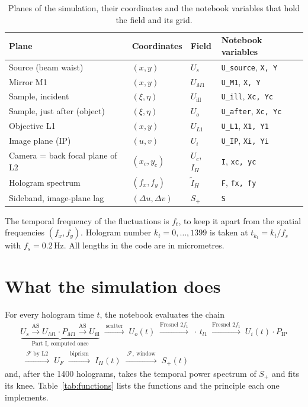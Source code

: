 \documentclass[11pt,a4paper]{article}
\newcommand{\FT}{\mathcal{F}}
\newcommand{\code}[1]{\texttt{\small #1}}
\begin{document}
\begin{table}[ht]
\centering
\small
\caption{Planes of the simulation, their coordinates and the notebook
variables that hold the field and its grid.}
\label{tab:planes}
\begin{tabular}{@{}llll@{}}
\toprule
Plane & Coordinates & Field & Notebook variables \\
\midrule
Source (beam waist) & $(x,y)$ & $U_s$ & \code{U\_source}, \code{X, Y} \\
Mirror M1 & $(x,y)$ & $U_{M1}$ & \code{U\_M1}, \code{X, Y} \\
Sample, incident & $(\xi,\eta)$ & $U_\mathrm{ill}$ & \code{U\_ill}, \code{Xc, Yc} \\
Sample, just after (object) & $(\xi,\eta)$ & $U_o$ & \code{U\_after}, \code{Xc, Yc} \\
Objective L1 & $(x,y)$ & $U_{L1}$ & \code{U\_L1}, \code{X1, Y1} \\
Image plane (IP) & $(u,v)$ & $U_i$ & \code{U\_IP}, \code{Xi, Yi} \\
Camera = back focal plane of L2 & $(x_c,y_c)$ & $U_c$, $I_H$ & \code{I}, \code{xc, yc} \\
Hologram spectrum & $(f_x,f_y)$ & $\tilde I_H$ & \code{F}, \code{fx, fy} \\
Sideband, image-plane lag & $(\Delta u,\Delta v)$ & $S_+$ & \code{S} \\
\bottomrule
\end{tabular}
\end{table}

The temporal frequency of the fluctuations is $f_t$, to keep it apart from the
spatial frequencies $(f_x,f_y)$. Hologram number $k_t = 0,\dots,1399$ is taken
at $t_{k_t} = k_t/f_s$ with $f_s = 0.2\,$Hz. All lengths in the code are in
micrometres.

\section{What the simulation does}
\label{sec:overview}

For every hologram time $t$, the notebook evaluates the chain
\begin{multline*}
\underbrace{U_s \xrightarrow{\text{AS}} U_{M1}\cdot P_{M1} \xrightarrow{\text{AS}} U_\mathrm{ill}}_{\text{Part I, computed once}}
\;\xrightarrow{\ \text{scatter}\ }\; U_o(t)
\;\xrightarrow{\text{Fresnel } 2f_1}\; \cdot\, t_{l1}
\;\xrightarrow{\text{Fresnel } 2f_1}\; U_i(t)\cdot P_\mathrm{IP}\\
\;\xrightarrow{\ \FT \text{ by L2}\ }\; U_F
\;\xrightarrow{\ \text{biprism}\ }\; I_H(t)
\;\xrightarrow{\ \FT,\ \text{window}\ }\; S_+(t)
\end{multline*}
and, after the 1400 holograms, takes the temporal power spectrum of $S_+$ and
fits its knee. Table~\ref{tab:functions} lists the functions and the principle
each one implements.
\end{document}
